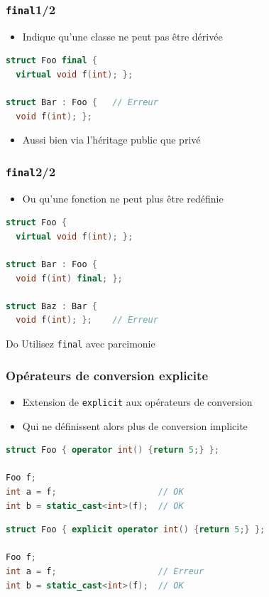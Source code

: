 \documentclass[C++.tex]{subfiles}
\begin{document}
\begin{frame}[fragile]
	\frametitle{\lstinline|final|\titlehfill{}1/2}
	\begin{itemize}
		\item Indique qu'une classe ne peut pas être dérivée
	\end{itemize}

	\begin{lstlisting}[language=C++]
struct Foo final {
  virtual void f(int); };

struct Bar : Foo {   // Erreur
  void f(int); };
\end{lstlisting}

	\begin{itemize}
		\item Aussi bien via l'héritage public que privé
	\end{itemize}
\end{frame}

\begin{frame}[fragile]
	\frametitle{\lstinline|final|\titlehfill{}2/2}
	\begin{itemize}
		\item Ou qu'une fonction ne peut plus être redéfinie
	\end{itemize}

	\begin{lstlisting}[language=C++]
struct Foo {
  virtual void f(int); };

struct Bar : Foo {
  void f(int) final; };

struct Baz : Bar {
  void f(int); };    // Erreur\end{lstlisting}

	\begin{exampleblock}{Do}
		Utilisez \lstinline|final| avec parcimonie
	\end{exampleblock}
\end{frame}

\begin{frame}[fragile]
	\frametitle{Opérateurs de conversion explicite}
	\begin{itemize}
		\item Extension de \lstinline|explicit| aux opérateurs de conversion
		\item Qui ne définissent alors plus de conversion implicite
	\end{itemize}

	\begin{lstlisting}[language=C++]
struct Foo { operator int() {return 5;} };

Foo f;
int a = f;	                  // OK
int b = static_cast<int>(f);  // OK\end{lstlisting}

	\begin{lstlisting}[language=C++]
struct Foo { explicit operator int() {return 5;} };

Foo f;
int a = f;	                  // Erreur
int b = static_cast<int>(f);  // OK\end{lstlisting}
\end{frame}
\end{document}
